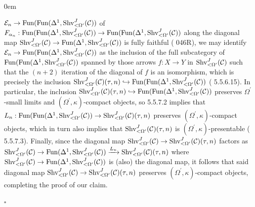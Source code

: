 \documentclass[10pt]{article}
\newcommand{\C}{\mathcal C}
\newcommand{\cE}{\mathcal{E}}
\renewcommand{\qed}{\hfill$\square$}
\renewenvironment{proof}{\begin{addmargin}[1em]{0em}\begin{newproof}}{\end{newproof}\end{addmargin}\qed}
\theoremstyle{witharg}
\theoremstyle{witharg}
\theoremstyle{witharg2}
\begin{document}
\begin{proof}
$\cE_n\rightarrow \textnormal{Fun}(\textnormal{Fun}(\Delta^1,\textnormal{Shv}^J_{<\Omega^\prime}(\C))$ of $F_{\alpha_{n}}:\textnormal{Fun}(\textnormal{Fun}(\Delta^1,\textnormal{Shv}^J_{<\Omega^\prime}(\C))\rightarrow \textnormal{Fun}(\textnormal{Fun}(\Delta^1,\textnormal{Shv}^J_{<\Omega^\prime}(\C))$ along the diagonal map $\textnormal{Shv}^J_{<\Omega^\prime}(\C)\rightarrow \textnormal{Fun}(\Delta^1,\textnormal{Shv}^J_{<\Omega^\prime}(\C))$ is fully faithful ( 046R), we may identify $\cE_n\rightarrow \textnormal{Fun}(\textnormal{Fun}(\Delta^1,\textnormal{Shv}^J_{<\Omega^\prime}(\C))$ as the inclusion of the full subcategory of $\textnormal{Fun}(\textnormal{Fun}(\Delta^1,\textnormal{Shv}^J_{<\Omega^\prime}(\C))$ spanned by those arrows $f:X\rightarrow Y$ in $\textnormal{Shv}^J_{<\Omega^\prime}(\C)$ such that the $(n+2)$ iteration of the diagonal of $f$ is an isomorphism, which is precisely the inclusion $\textnormal{Shv}^J_{<\Omega^\prime}(\C)(\tau,n)\hookrightarrow \textnormal{Fun}(\textnormal{Fun}(\Delta^1,\textnormal{Shv}^J_{<\Omega^\prime}(\C))$ ( 5.5.6.15). In particular, the inclusion $\textnormal{Shv}^J_{<\Omega^\prime}(\C)(\tau,n)\hookrightarrow \textnormal{Fun}(\textnormal{Fun}(\Delta^1,\textnormal{Shv}^J_{<\Omega^\prime}(\C))$ preserves $\Omega^\prime$-small limits and $(\Omega^\prime,\kappa)$-compact objects, so  5.5.7.2 implies that $L_n:\textnormal{Fun}(\textnormal{Fun}(\Delta^1,\textnormal{Shv}^J_{<\Omega^\prime}(\C))\rightarrow \textnormal{Shv}^J_{<\Omega^\prime}(\C)(\tau,n)$ preserves $(\Omega^\prime,\kappa)$-compact objects, which in turn also implies that $\textnormal{Shv}^J_{<\Omega^\prime}(\C)(\tau,n)$ is $(\Omega^\prime,\kappa)$-presentable ( 5.5.7.3). Finally, since the diagonal map $\textnormal{Shv}^J_{<\Omega^\prime}(\C)\rightarrow \textnormal{Shv}^J_{<\Omega^\prime}(\C)(\tau,n)$ factors as $\textnormal{Shv}^J_{<\Omega^\prime}(\C)\rightarrow  \textnormal{Fun}(\Delta^1,\textnormal{Shv}^J_{<\Omega^\prime}(\C))\xrightarrow{L_n}\textnormal{Shv}^J_{<\Omega^\prime}(\C)(\tau,n)$ where $\textnormal{Shv}^J_{<\Omega^\prime}(\C)\rightarrow \textnormal{Fun}(\Delta^1,\textnormal{Shv}^J_{<\Omega^\prime}(\C))$ is (also) the diagonal map, it follows that said diagonal map $\textnormal{Shv}^J_{<\Omega^\prime}(\C)\rightarrow \textnormal{Shv}^J_{<\Omega^\prime}(\C)(\tau,n)$ preserves $(\Omega^\prime,\kappa)$-compact objects, completing the proof of our claim. 
     
\end{proof}
\end{document}
